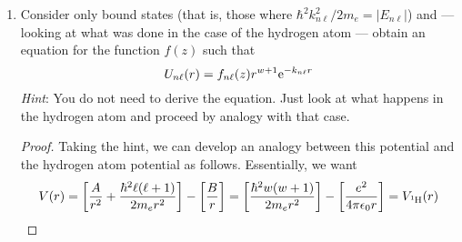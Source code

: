 \documentclass[../psets.tex]{subfiles}
\begin{document}
\begin{enumerate}
\begin{enumerate}
\begin{proof}
            In the limiting case that $r$ is small ($r\to 0$), we can approximate the potential as giving us
            \begin{align*}
                0 &= -\frac{\hbar^2}{2m_e}\dv[2]{r}[U_{n\ell}(r)]+\left[ \frac{\hbar^2w(w+1)}{2m_er^2} \right]U_{n\ell}(r)\\
                \dv[2]{r}[U_{n\ell}(r)] &= \left[ \frac{w(w+1)}{r^2} \right]U_{n\ell}(r)
            \end{align*}
            Thus, since the ansatz $r^{w+1}$ satisfies the above ODE, we also have that
            \begin{equation*}
                U_{n\ell}(r) \propto r^{w+1}
            \end{equation*}
            Therefore, we have overall that
            \begin{equation*}
                U_{n\ell}(r) \propto r^{w+1}\e[-k_{n\ell}r]
            \end{equation*}
            and hence
            \begin{equation*}
                U_{n\ell}(r) = f_{n\ell}(r)r^{w+1}\e[-k_{n\ell}r]
            \end{equation*}
            where $f_{n\ell}(r)$ is some function.
        \end{proof}
        \item Consider only bound states (that is, those where $\hbar^2k_{n\ell}^2/2m_e=|E_{n\ell}|$) and --- looking at what was done in the case of the hydrogen atom --- obtain an equation for the function $f(z)$ such that
        \begin{equation}
            U_{n\ell}(r) = f_{n\ell}(z)r^{w+1}\e[-k_{n\ell}r]
        \end{equation}
        \emph{Hint}: You do not need to derive the equation. Just look at what happens in the hydrogen atom and proceed by analogy with that case.
        \begin{proof}
            Taking the hint, we can develop an analogy between this potential and the hydrogen atom potential as follows. Essentially, we want
            \begin{equation*}
                V(r) = \left[ \frac{A}{r^2}+\frac{\hbar^2\ell(\ell+1)}{2m_er^2} \right]-\left[ \frac{B}{r} \right]
                = \left[ \frac{\hbar^2w(w+1)}{2m_er^2} \right]-\left[ \frac{e^2}{4\pi\epsilon_0r} \right]
                = V_{\ce{{}^1H}}(r)
            \end{equation*}
            \newpage
            

\end{proof}
\end{enumerate}
\end{enumerate}
\end{document}

